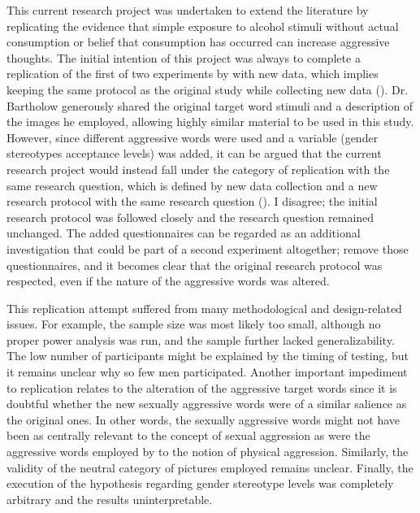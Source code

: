 \documentclass[serif, twocolumn, numeric, empirical]{jote-article}
\begin{document}
This current research project was undertaken to extend the literature by replicating the evidence that simple exposure to alcohol stimuli without actual consumption or belief that consumption has occurred can increase aggressive thoughts. The initial intention of this project was always to complete a replication of the first of two experiments by \textcite{BartholowHeinz2006} with new data, which implies keeping the same protocol as the original study while collecting new data (\cite{NWO}). Dr. Bartholow generously shared the original target word stimuli and a description of the images he employed, allowing highly similar material to be used in this study. However, since different aggressive words were used and a variable (gender stereotypes acceptance levels) was added, it can be argued that the current research project would instead fall under the category of replication with the same research question, which is defined by new data collection and a new research protocol with the same research question (\cite{NWO}). I disagree; the initial research protocol was followed closely and the research question remained unchanged. The added questionnaires can be regarded as an additional investigation that could be part of a second experiment altogether; remove those questionnaires, and it becomes clear that the original research protocol was respected, even if the nature of the aggressive words was altered.

This replication attempt suffered from many methodological and design-related issues. For example, the sample size was most likely too small, although no proper power analysis was run, and the sample further lacked generalizability. The low number of participants might be explained by the timing of testing, but it remains unclear why so few men participated. Another important impediment to replication relates to the alteration of the aggressive target words since it is doubtful whether the new sexually aggressive words were of a similar salience as the original ones. In other words, the sexually aggressive words might not have been as centrally relevant to the concept of sexual aggression as were the aggressive words employed by \textcite{BartholowHeinz2006} to the notion of physical aggression. Similarly, the validity of the neutral category of pictures employed remains unclear. Finally, the execution of the hypothesis regarding gender stereotype levels was completely arbitrary and the results uninterpretable.
\end{document}
